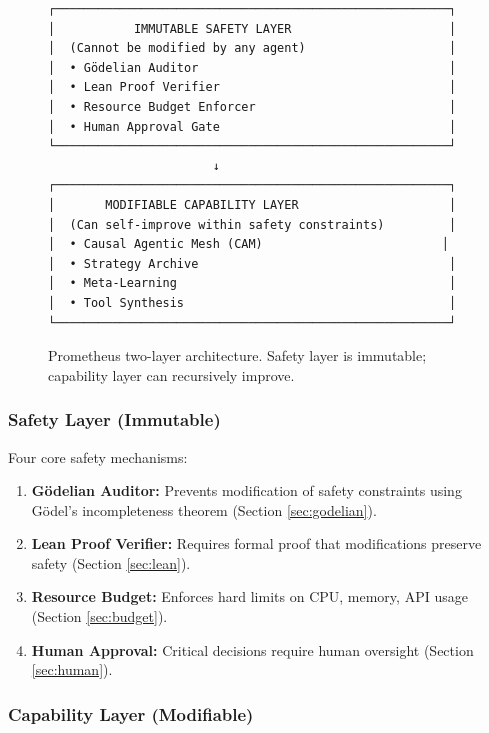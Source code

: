 \documentclass[11pt,letterpaper]{article}
\begin{document}
\begin{figure}[t]
\centering
\begin{verbatim}
┌───────────────────────────────────────────────────────┐
│           IMMUTABLE SAFETY LAYER                      │
│  (Cannot be modified by any agent)                    │
│  • Gödelian Auditor                                   │
│  • Lean Proof Verifier                                │
│  • Resource Budget Enforcer                           │
│  • Human Approval Gate                                │
└───────────────────────────────────────────────────────┘
                       ↓
┌───────────────────────────────────────────────────────┐
│       MODIFIABLE CAPABILITY LAYER                     │
│  (Can self-improve within safety constraints)         │
│  • Causal Agentic Mesh (CAM)                         │
│  • Strategy Archive                                   │
│  • Meta-Learning                                      │
│  • Tool Synthesis                                     │
└───────────────────────────────────────────────────────┘
\end{verbatim}
\caption{Prometheus two-layer architecture. Safety layer is immutable; capability layer can recursively improve.}
\label{fig:architecture}
\end{figure}

\subsubsection{Safety Layer (Immutable)}

Four core safety mechanisms:

\begin{enumerate}
\item \textbf{Gödelian Auditor:} Prevents modification of safety constraints using Gödel's incompleteness theorem (Section \ref{sec:godelian}).
\item \textbf{Lean Proof Verifier:} Requires formal proof that modifications preserve safety (Section \ref{sec:lean}).
\item \textbf{Resource Budget:} Enforces hard limits on CPU, memory, API usage (Section \ref{sec:budget}).
\item \textbf{Human Approval:} Critical decisions require human oversight (Section \ref{sec:human}).
\end{enumerate}

\subsubsection{Capability Layer (Modifiable)}
\end{document}
